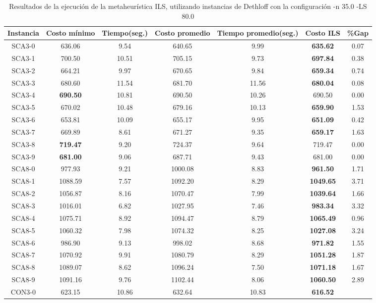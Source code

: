 \begin{table}[ht]
\caption{Resultados de la ejecución de la metaheurística ILS, utilizando instancias de Dethloff con la configuración -n 35.0 -LS 80.0}
\centering
\small
\begin{tabular}{c c c c c c c}
\hline\hline
Instancia & Costo mínimo & Tiempo(seg.) & Costo promedio & Tiempo promedio(seg.) & Costo ILS & \%Gap \\ [0.5ex]
\hline
SCA3-0 & 636.06 & 9.54 & 
640.65 & 9.99 & \bf{635.62} & 
0.07\\SCA3-1 & 700.50 & 10.51 & 
705.15 & 9.73 & \bf{697.84} & 
0.38\\SCA3-2 & 664.21 & 9.97 & 
670.65 & 9.84 & \bf{659.34} & 
0.74\\SCA3-3 & 680.60 & 11.54 & 
681.70 & 11.56 & \bf{680.04} & 
0.08\\SCA3-4 & \bf{690.50} & 10.81 & 
690.50 & 10.26 & 690.50 & 0.00\\
SCA3-5 & 670.02 & 10.48 & 
679.16 & 10.13 & \bf{659.90} & 
1.53\\SCA3-6 & 653.81 & 10.09 & 
655.17 & 9.95 & \bf{651.09} & 
0.42\\SCA3-7 & 669.89 & 8.61 & 
671.27 & 9.35 & \bf{659.17} & 
1.63\\SCA3-8 & \bf{719.47} & 9.20 & 
724.37 & 9.64 & 719.47 & 0.00\\
SCA3-9 & \bf{681.00} & 9.06 & 
687.71 & 9.43 & 681.00 & 0.00\\
SCA8-0 & 977.93 & 9.21 & 
1000.08 & 8.83 & \bf{961.50} & 
1.71\\SCA8-1 & 1088.59 & 7.57 & 
1092.20 & 8.29 & \bf{1049.65} & 
3.71\\SCA8-2 & 1056.87 & 8.16 & 
1070.47 & 7.99 & \bf{1039.64} & 
1.66\\SCA8-3 & 1016.01 & 6.82 & 
1027.95 & 7.46 & \bf{983.34} & 
3.32\\SCA8-4 & 1075.71 & 8.92 & 
1094.47 & 8.79 & \bf{1065.49} & 
0.96\\SCA8-5 & 1060.32 & 7.98 & 
1074.32 & 8.25 & \bf{1027.08} & 
3.24\\SCA8-6 & 986.90 & 9.13 & 
998.02 & 8.68 & \bf{971.82} & 
1.55\\SCA8-7 & 1070.92 & 9.91 & 
1080.79 & 8.29 & \bf{1051.28} & 
1.87\\SCA8-8 & 1089.07 & 8.62 & 
1096.24 & 7.50 & \bf{1071.18} & 
1.67\\SCA8-9 & 1091.16 & 9.76 & 
1102.44 & 8.06 & \bf{1060.50} & 
2.89\\CON3-0 & 623.15 & 10.86 & 
632.64 & 10.83 & \bf{616.52} & 

\end{tabular}
\end{table}
